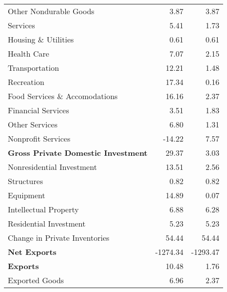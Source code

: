 \documentclass[11pt, letterpaper]{article}\usepackage[]{graphicx}\usepackage[]{color}
\begin{document}
\begin{table}[H]
\begin{tabular}{lrr}
  \hspace{24mm}  Other Nondurable Goods & 3.87 & 3.87 \\ 
  \hspace{8mm}  Services & 5.41 & 1.73 \\ 
  \hspace{16mm}  Housing \& Utilities & 0.61 & 0.61 \\ 
  \hspace{16mm}  Health Care & 7.07 & 2.15 \\ 
  \hspace{16mm}  Transportation & 12.21 & 1.48 \\ 
  \hspace{16mm}  Recreation & 17.34 & 0.16 \\ 
  \hspace{16mm}  Food Services \& Accomodations & 16.16 & 2.37 \\ 
  \hspace{16mm}  Financial Services & 3.51 & 1.83 \\ 
  \hspace{16mm}  Other Services & 6.80 & 1.31 \\ 
  \hspace{16mm}  Nonprofit Services & -14.22 & 7.57 \\ 
  \hspace{0mm} \textbf{Gross Private Domestic Investment} & 29.37 & 3.03 \\ 
  \hspace{8mm}  Nonresidential Investment & 13.51 & 2.56 \\ 
  \hspace{16mm}  Structures & 0.82 & 0.82 \\ 
  \hspace{16mm}  Equipment & 14.89 & 0.07 \\ 
  \hspace{16mm}  Intellectual Property & 6.88 & 6.28 \\ 
  \hspace{8mm}  Residential Investment & 5.23 & 5.23 \\ 
  \hspace{8mm}  Change in Private Inventories & 54.44 & 54.44 \\ 
  \hspace{0mm} \textbf{Net Exports} & -1274.34 & -1293.47 \\ 
  \hspace{0mm} \textbf{Exports} & 10.48 & 1.76 \\ 
  \hspace{8mm}  Exported Goods & 6.96 & 2.37 \\ 

\end{tabular}
\end{table}
\end{document}
